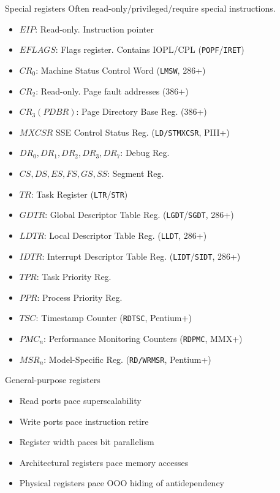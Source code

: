 \documentclass[xcolor={dvipsnames,table}]{beamer}
\begin{document}
\begin{frame}{Special registers}
Often read-only/privileged/require special instructions.
\tiny{
\begin{itemize}
\item $EIP$: Read-only. Instruction pointer
\item $EFLAGS$: Flags register. Contains IOPL/CPL (\texttt{POPF}/\texttt{IRET})
\item $CR_0$: Machine Status Control Word (\texttt{LMSW}, 286+)
\item $CR_2$: Read-only. Page fault addresses (386+)
\item $CR_3 (PDBR)$: Page Directory Base Reg. (386+)
\item $MXCSR$ SSE Control Status Reg. (\texttt{LD/STMXCSR}, PIII+)
\item $DR_0, DR_1, DR_2, DR_3, DR_7$: Debug Reg.
\item $CS, DS, ES, FS, GS, SS$: Segment Reg.
\item $TR$: Task Register (\texttt{LTR}/\texttt{STR})
\item $GDTR$: Global Descriptor Table Reg. (\texttt{LGDT}/\texttt{SGDT}, 286+)
\item $LDTR$: Local Descriptor Table Reg. (\texttt{LLDT}, 286+)
\item $IDTR$: Interrupt Descriptor Table Reg. (\texttt{LIDT}/\texttt{SIDT}, 286+)
\item $TPR$: Task Priority Reg.
\item $PPR$: Process Priority Reg.
\item $TSC$: Timestamp Counter (\texttt{RDTSC}, Pentium+)
\item $PMC_n$: Performance Monitoring Counters (\texttt{RDPMC}, MMX+)
\item $MSR_n$: Model-Specific Reg. (\texttt{RD/WRMSR}, Pentium+)
\end{itemize}
}
\end{frame}

\begin{frame}{General-purpose registers}
\begin{itemize}
\item Read ports pace superscalability
\item Write ports pace instruction retire
\item Register width paces bit parallelism
\item Architectural registers pace memory accesses
\item Physical registers pace OOO hiding of antidependency
\end{itemize}
\end{frame}
\end{document}
